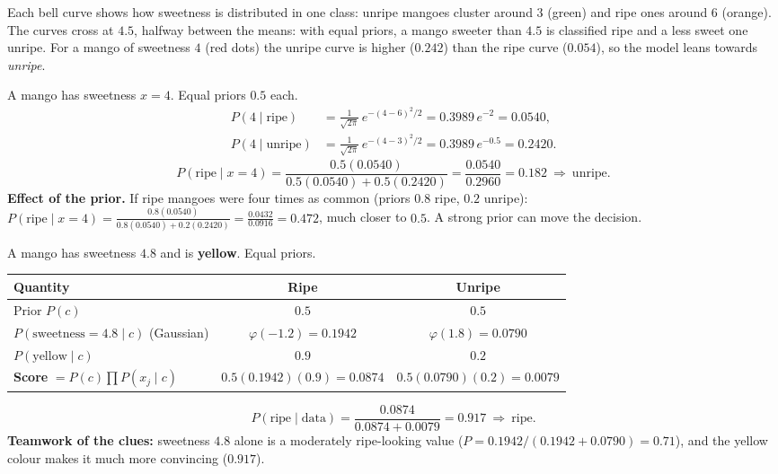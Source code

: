 \begin{explain}
Each bell curve shows how sweetness is distributed in one class: unripe mangoes cluster around $3$ (green) and ripe ones around $6$ (orange). The curves cross at $4.5$, halfway between the means: with equal priors, a mango sweeter than $4.5$ is classified ripe and a less sweet one unripe. For a mango of sweetness $4$ (red dots) the unripe curve is higher ($0.242$) than the ripe curve ($0.054$), so the model leans towards \emph{unripe}.
\end{explain}

\begin{example}
A mango has sweetness $x=4$. Equal priors $0.5$ each.
\begin{align*}
  P(4\mid\text{ripe})&=\tfrac{1}{\sqrt{2\pi}}\,e^{-(4-6)^2/2}=0.3989\,e^{-2}=0.0540,\\
  P(4\mid\text{unripe})&=\tfrac{1}{\sqrt{2\pi}}\,e^{-(4-3)^2/2}=0.3989\,e^{-0.5}=0.2420 .
\end{align*}
\[
  P(\text{ripe}\mid x=4)=\frac{0.5(0.0540)}{0.5(0.0540)+0.5(0.2420)}=\frac{0.0540}{0.2960}=\mathbf{0.182}\ \Rightarrow\ \text{unripe}.
\]
\textbf{Effect of the prior.} If ripe mangoes were four times as common (priors $0.8$ ripe, $0.2$ unripe): $P(\text{ripe}\mid x=4)=\frac{0.8(0.0540)}{0.8(0.0540)+0.2(0.2420)}=\frac{0.0432}{0.0916}=0.472$, much closer to $0.5$. A strong prior can move the decision.
\end{example}

\begin{example}
A mango has sweetness $4.8$ and is \textbf{yellow}. Equal priors.

\medskip
\begin{center}
\begin{tabular}{@{}lcc@{}}
\toprule
\textbf{Quantity} & \textbf{Ripe} & \textbf{Unripe}\\
\midrule
Prior $P(c)$ & $0.5$ & $0.5$\\
$P(\text{sweetness}=4.8\mid c)$ (Gaussian) & $\varphi(-1.2)=0.1942$ & $\varphi(1.8)=0.0790$\\
$P(\text{yellow}\mid c)$ & $0.9$ & $0.2$\\
\midrule
\textbf{Score} $=P(c)\prod P(x_j\mid c)$ & $0.5(0.1942)(0.9)=0.0874$ & $0.5(0.0790)(0.2)=0.0079$\\
\bottomrule
\end{tabular}
\end{center}
\[
  P(\text{ripe}\mid\text{data})=\frac{0.0874}{0.0874+0.0079}=\mathbf{0.917}\ \Rightarrow\ \text{ripe}.
\]
\textbf{Teamwork of the clues:} sweetness $4.8$ alone is a moderately ripe-looking value ($P=0.1942/(0.1942+0.0790)=0.71$), and the yellow colour makes it much more convincing ($0.917$).
\end{example}

